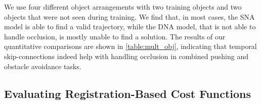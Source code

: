 We use four different object arrangements with two training objects and two objects that were not seen during training. We find that, in most cases, the SNA model is able to find a valid trajectory, while the DNA model, that is not able to handle occlusion, is mostly unable to find a solution. The results of our quantitative comparisons are shown in \autoref{table:mult_obj}, indicating that temporal skip-connections indeed help with handling occlusion in combined pushing and obstacle avoidance tasks. 

\subsection{Evaluating Registration-Based Cost Functions}
\label{susbsec:reg_cost_exp}

